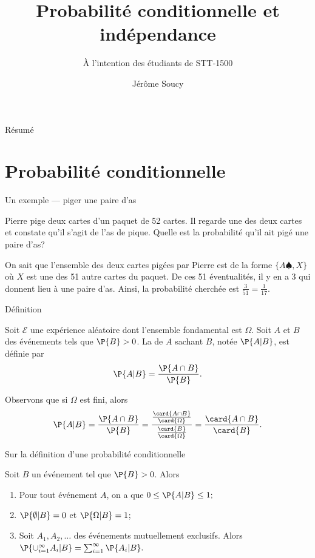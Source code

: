 \documentclass[nuit,charter,pied]{BeamerJS}
\title{Probabilité conditionnelle et indépendance}
\subtitle{À l'intention des étudiants de STT-1500}
\institute{Université Laval}
\author{Jérôme Soucy}
\date{}
\begin{document}
\begin{frame}
	\titlepage
\end{frame}
\begin{frame}{Résumé}
\tableofcontents
\end{frame}

\section{Probabilité conditionnelle}
\begin{frame}{Un exemple --- piger une paire d'as}
\pause
	\begin{ex}
	Pierre pige deux cartes d'un paquet de 52 cartes. Il regarde une des deux cartes et constate qu'il s'agit de l'as de pique. Quelle est la probabilité qu'il ait pigé une paire d'as?
	\end{ex}
	\pause
	 On sait que l'ensemble des deux cartes pigées par Pierre est de la forme \(\{A\spadesuit,X\}\) où \(X\) est une des 51 autre cartes du paquet. De ces 51 éventualités, il y en a 3 qui donnent lieu à une paire d'as. Ainsi, la probabilité cherchée est \(\frac{3}{51}=\frac{1}{17}.\)
\end{frame}

\begin{frame}{Définition}
	\begin{defn}
		Soit $\mathcal{E}$ une expérience aléatoire dont l'ensemble fondamental est $\Omega$. Soit $A$ et $B$ des événements tels que $\P{B}>0$. La  de $A$ sachant $B$, notée $\P{A|B}$, est définie par
		\[\P{A|B}=\frac{\P{A\cap B}}{\P{B}}.\]
	\end{defn}
	\pause
		Observons que si \(\Omega\) est fini, alors
	\[
	\P{A|B}=\frac{\P{A\cap B}}{\P{B}}=\frac{
		\frac{\card{A\cap B}}{\card{\Omega}}}
	{\frac{\card{B}}{\card{\Omega}}}=\frac{\card{A\cap B}}{\card{B}
	}.
	\]
\end{frame}
\begin{frame}{Sur la définition d'une probabilité conditionnelle}
	\begin{thm}
		Soit $B$ un événement tel que $\P{B}>0$. \pause Alors
		\begin{enumerate}
			\item Pour tout événement $A$, on a que $0\leq \P{A|B}\leq 1;$ \pause
			\item $\P{\emptyset|B}=0$ et $\P{\Omega|B}=1$;\pause
			\item Soit $A_1,A_2,\ldots$ des événements mutuellement exclusifs. Alors
			\(\P{\cup_{i=1}^{\infty}A_i|B}=\sum_{i=1}^{\infty}\P{A_i|B}.\)
		\end{enumerate}
	\end{thm}
\end{frame}
\end{document}
